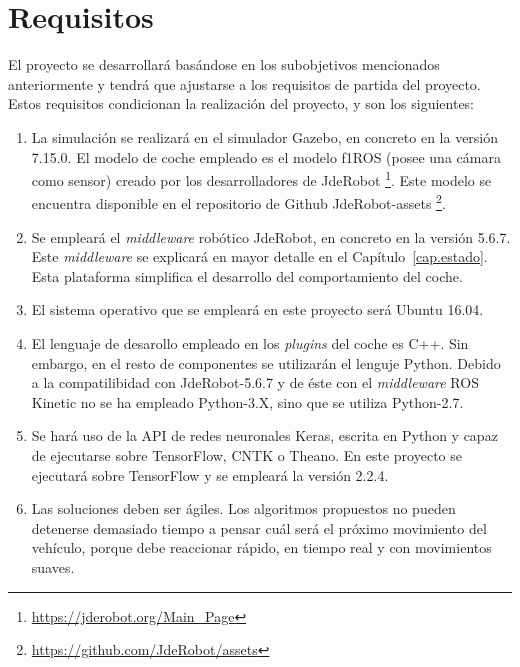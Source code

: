 \section{Requisitos}

El proyecto se desarrollará basándose en los subobjetivos mencionados anteriormente y tendrá que ajustarse a los requisitos de partida del proyecto. Estos requisitos condicionan la realización del proyecto, y son los siguientes: 

\begin{enumerate}
    \item La simulación se realizará en el simulador Gazebo, en concreto en la versión 7.15.0. El modelo de coche empleado es el modelo f1ROS (posee una cámara como sensor) creado por los desarrolladores de JdeRobot \footnote{\url{https://jderobot.org/Main_Page}}. Este modelo se encuentra disponible en el repositorio de Github JdeRobot-assets \footnote{\url{https://github.com/JdeRobot/assets}}.

    \item Se empleará el \textit{middleware} robótico JdeRobot, en concreto en la versión 5.6.7. Este \textit{middleware} se explicará en mayor detalle en el Capítulo~\ref{cap.estado}. Esta plataforma simplifica el desarrollo del comportamiento del coche.

    \item El sistema operativo que se empleará en este proyecto será Ubuntu 16.04.
    
    \item El lenguaje de desarollo empleado en los \textit{plugins} del coche es C++. Sin embargo, en el resto de componentes se utilizarán el lenguje Python. Debido a la compatilibidad con JdeRobot-5.6.7 y de éste con el \textit{middleware} ROS Kinetic no se ha empleado Python-3.X, sino que se utiliza Python-2.7.
    
    \item Se hará uso de la API de redes neuronales Keras, escrita en Python y capaz de ejecutarse sobre TensorFlow, CNTK o Theano. En este proyecto se ejecutará sobre TensorFlow y se empleará la versión 2.2.4.
    
    \item Las soluciones deben ser ágiles. Los algoritmos propuestos no pueden detenerse demasiado tiempo a pensar cuál será el próximo movimiento del vehículo, porque debe reaccionar rápido, en tiempo real y con movimientos suaves.
    
\end{enumerate}


